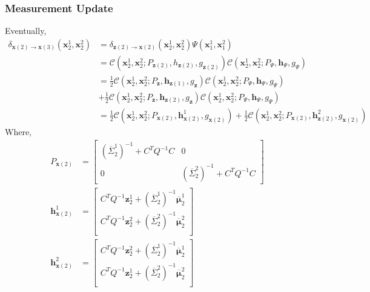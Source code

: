 \subsubsection{Measurement Update}
\label{subsubsection:measurement_update}
Eventually, 
\begin{align*}
\delta_{\pmb{x}(2) \rightarrow \pmb{x}(3)} \left( \pmb{x}_{2}^{1}, \pmb{x}_{2}^{2} \right)  &= \delta_{\pmb{z}(2) \rightarrow \pmb{x}(2)} \left( \pmb{x}_{2}^{1}, \pmb{x}_{2}^{2} \right) \Psi \left( \pmb{x}_{1}^{1}, \pmb{x}_{1}^{2} \right) \\
&= \mathcal{C} \left( \pmb{x}_{2}^{1}, \pmb{x}_{2}^{2}; P_{\pmb{z}(2)}, h_{\pmb{z}(2)}, g_{\pmb{z}(2)} \right) \mathcal{C} \left( \pmb{x}_{2}^{1}, \pmb{x}_{2}^{2}; P_{\Psi}, \pmb{h}_{\Psi}, g_{\Psi} \right) \\
&= \frac{1}{2} \mathcal{C} \left(  \pmb{x}_{2}^{1},  \pmb{x}_{2}^{2}; P_{\pmb{z}}  ,  \pmb{h}_{\pmb{z}(1)}, g_{\pmb{z}} \right) \mathcal{C} \left( \pmb{x}_{2}^{1}, \pmb{x}_{2}^{2}; P_{\Psi}, \pmb{h}_{\Psi}, g_{\Psi} \right) \\
&+ \frac{1}{2} \mathcal{C} \left(  \pmb{x}_{2}^{1},  \pmb{x}_{2}^{2}; P_{\pmb{z}}, \pmb{h}_{\pmb{z}(2)}, g_{\pmb{z}} \right) \mathcal{C} \left( \pmb{x}_{2}^{1}, \pmb{x}_{2}^{2}; P_{\Psi}, \pmb{h}_{\Psi}, g_{\Psi} \right)  \\
&= \frac{1}{2} \mathcal{C} \left(  \pmb{x}_{2}^{1},  \pmb{x}_{2}^{2}; P_{\pmb{x}(2)}  ,  \pmb{h}_{\pmb{x}(2)}^{1}, g_{\pmb{x}(2)} \right) + \frac{1}{2} \mathcal{C} \left(  \pmb{x}_{2}^{1},  \pmb{x}_{2}^{2}; P_{\pmb{x}(2)} , \pmb{h}_{\pmb{z}(2)}^{2}, g_{\pmb{x}(2)} \right)
\end{align*}
Where,
\begin{align}
P_{\pmb{x}(2)} &= \begin{bmatrix}
\left( \overline{\Sigma}_{2}^{1} \right)^{-1} + C^{T} Q^{-1} C & 0 \\
0 & \left( \overline{\Sigma}_{2}^{2} \right)^{-1} + C^{T} Q^{-1} C 
\end{bmatrix} \\
\pmb{h}_{\pmb{x}(2)}^{1} &= \begin{bmatrix}
C^{T} Q^{-1} \pmb{z}_{2}^{1} + \left( \overline{\Sigma}_{2}^{1} \right)^{-1} \overline{\pmb{\mu}}_{2}^{1} \\
C^{T} Q^{-1} \pmb{z}_{2}^{2} + \left( \overline{\Sigma}_{2}^{2} \right)^{-1} \overline{\pmb{\mu}}_{2}^{2} \\
\end{bmatrix} \\
\pmb{h}_{\pmb{x}(2)}^{2} &= \begin{bmatrix}
C^{T} Q^{-1} \pmb{z}_{2}^{2} + \left( \overline{\Sigma}_{2}^{1} \right)^{-1} \overline{\pmb{\mu}}_{2}^{1} \\
C^{T} Q^{-1} \pmb{z}_{2}^{1} + \left( \overline{\Sigma}_{2}^{2} \right)^{-1} \overline{\pmb{\mu}}_{2}^{2} \\
\end{bmatrix} 
\end{align}

